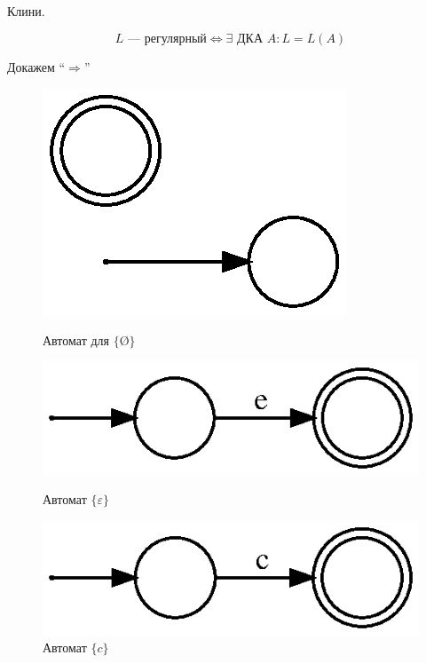 \begin{theorem}
    Клини.

    $$L \text{ --- регулярный} \Leftrightarrow \exists \text{ ДКА } A : L = L(A)$$
\end{theorem}
Докажем ``$\Rightarrow$''
\begin{figure}[h]
    \centering
    \begin{minipage}{.3\textwidth}
        \centering
        \includegraphics[scale=0.7]{graphs/8.5.dot.eps}
        \caption{Автомат для $\{\text{\O}\}$}
        \end{minipage}%
    \begin{minipage}{.3\textwidth}
        \centering
        \includegraphics[scale=0.7]{graphs/8.6.dot.eps}
        \caption{Автомат $\{\varepsilon\}$}
    \end{minipage}
    \begin{minipage}{.3\textwidth}
        \centering
        \includegraphics[scale=0.7]{graphs/8.7.dot.eps}
        \caption{Автомат $\{c\}$}
    \end{minipage}
    \begin{minipage}{.5\textwidth}

\end{minipage}
\end{figure}
